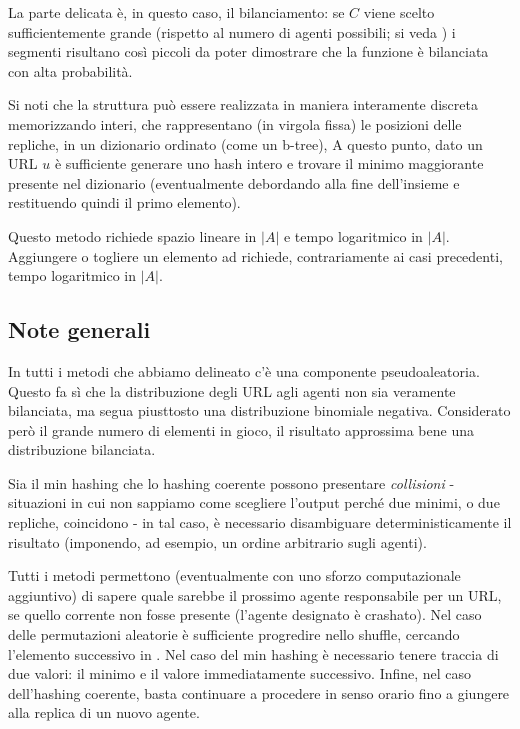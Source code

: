 La parte delicata è, in questo caso, il bilanciamento: se $C$ viene scelto sufficientemente grande (rispetto al numero di agenti possibili; si veda %
) i segmenti risultano così piccoli da poter dimostrare che la funzione è bilanciata con alta probabilità.

Si noti che la struttura può essere realizzata in maniera interamente discreta memorizzando interi, che rappresentano (in virgola fissa) le posizioni delle repliche, in un dizionario ordinato (come un b-tree), A questo punto, dato un URL $u$ è sufficiente generare uno hash intero e trovare il minimo maggiorante presente nel dizionario (eventualmente debordando alla fine dell'insieme e restituendo quindi il primo elemento).

Questo metodo richiede spazio lineare in $|A|$ e tempo logaritmico in $|A|$. Aggiungere o togliere un elemento ad  richiede, contrariamente ai casi precedenti, tempo logaritmico in $|A|$.
\subsection{Note generali}
In tutti i metodi che abbiamo delineato c'è una componente pseudoaleatoria. Questo fa sì che la distribuzione degli URL agli agenti non sia veramente bilanciata, ma segua piusttosto una distribuzione binomiale negativa. Considerato però il grande numero di elementi in gioco, il risultato approssima bene una distribuzione bilanciata.

Sia il min hashing che lo hashing coerente possono presentare \textit{collisioni} - situazioni in cui non sappiamo come scegliere l'output perché due minimi, o due repliche, coincidono - in tal caso, è necessario disambiguare deterministicamente il risultato (imponendo, ad esempio, un ordine arbitrario sugli agenti).

Tutti i metodi permettono (eventualmente con uno sforzo computazionale aggiuntivo) di sapere quale sarebbe il prossimo agente responsabile per un URL, se quello corrente non fosse presente (l'agente designato è crashato). Nel caso delle permutazioni aleatorie è sufficiente progredire nello shuffle, cercando l'elemento successivo in . Nel caso del min hashing è necessario tenere traccia di due valori: il minimo e il valore immediatamente successivo. Infine, nel caso dell'hashing coerente, basta continuare a procedere in senso orario fino a giungere alla replica di un nuovo agente.
